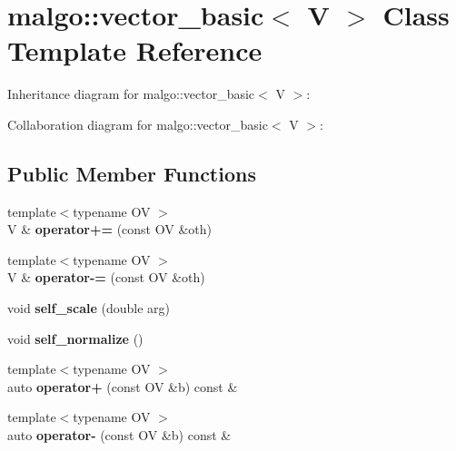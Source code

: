 \hypertarget{classmalgo_1_1vector__basic}{}\section{malgo\+:\+:vector\+\_\+basic$<$ V $>$ Class Template Reference}
\label{classmalgo_1_1vector__basic}


Inheritance diagram for malgo\+:\+:vector\+\_\+basic$<$ V $>$\+:


Collaboration diagram for malgo\+:\+:vector\+\_\+basic$<$ V $>$\+:
\subsection*{Public Member Functions}
\begin{DoxyCompactItemize}
\item 
{\footnotesize template$<$typename OV $>$ }\\V \& {\bfseries operator+=} (const OV \&oth)\hypertarget{classmalgo_1_1vector__basic_a171b41889495af1bcbddd395c1ab8afa}{}\label{classmalgo_1_1vector__basic_a171b41889495af1bcbddd395c1ab8afa}

\item 
{\footnotesize template$<$typename OV $>$ }\\V \& {\bfseries operator-\/=} (const OV \&oth)\hypertarget{classmalgo_1_1vector__basic_a9365d8dbf0f7e0f13e291703dac41d26}{}\label{classmalgo_1_1vector__basic_a9365d8dbf0f7e0f13e291703dac41d26}

\item 
void {\bfseries self\+\_\+scale} (double arg)\hypertarget{classmalgo_1_1vector__basic_a9a325533b9c8fe90fbe03ba19d659069}{}\label{classmalgo_1_1vector__basic_a9a325533b9c8fe90fbe03ba19d659069}

\item 
void {\bfseries self\+\_\+normalize} ()\hypertarget{classmalgo_1_1vector__basic_a38c8df1e67b191acb82f5645596eb843}{}\label{classmalgo_1_1vector__basic_a38c8df1e67b191acb82f5645596eb843}

\item 
{\footnotesize template$<$typename OV $>$ }\\auto {\bfseries operator+} (const OV \&b) const \&\hypertarget{classmalgo_1_1vector__basic_a608533646455ede10fa2676dd965131d}{}\label{classmalgo_1_1vector__basic_a608533646455ede10fa2676dd965131d}

\item 
{\footnotesize template$<$typename OV $>$ }\\auto {\bfseries operator-\/} (const OV \&b) const \&\hypertarget{classmalgo_1_1vector__basic_ac7ff1898dd638581af79b4310b31d82f}{}\label{classmalgo_1_1vector__basic_ac7ff1898dd638581af79b4310b31d82f}


\end{DoxyCompactItemize}
